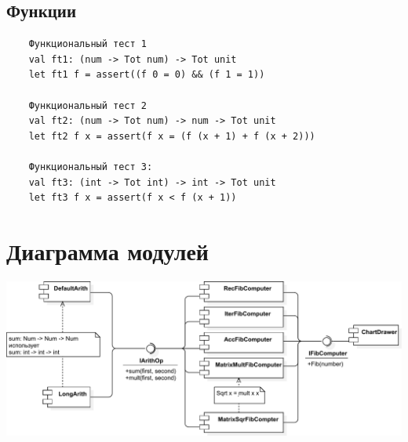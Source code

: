 \documentclass{article}
\begin{document}
  \subsection{Функции}
  \begin{verbatim}
    Функциональный тест 1
    val ft1: (num -> Tot num) -> Tot unit
    let ft1 f = assert((f 0 = 0) && (f 1 = 1))

    Функциональный тест 2
    val ft2: (num -> Tot num) -> num -> Tot unit
    let ft2 f x = assert(f x = (f (x + 1) + f (x + 2)))
    
    Функциональный тест 3:
    val ft3: (int -> Tot int) -> int -> Tot unit
    let ft3 f x = assert(f x < f (x + 1))
  \end{verbatim}
  \pagebreak
  \section{Диаграмма модулей}
  \includegraphics[width=1.25\textwidth]{DM}
\end{document}
